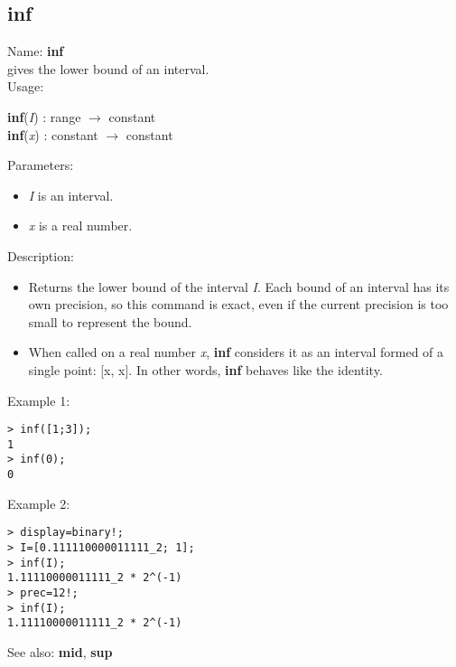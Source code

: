 \subsection{ inf }
\noindent Name: \textbf{inf}\\
gives the lower bound of an interval.\\

\noindent Usage: 
\begin{center}
\textbf{inf}(\emph{I}) : \textsf{range} $\rightarrow$ \textsf{constant}\\
\textbf{inf}(\emph{x}) : \textsf{constant} $\rightarrow$ \textsf{constant}\\
\end{center}
Parameters: 
\begin{itemize}
\item \emph{I} is an interval.
\item \emph{x} is a real number.
\end{itemize}
\noindent Description: \begin{itemize}

\item Returns the lower bound of the interval \emph{I}. Each bound of an interval has its 
   own precision, so this command is exact, even if the current precision is too 
   small to represent the bound.

\item When called on a real number \emph{x}, \textbf{inf} considers it as an interval formed
   of a single point: [x, x]. In other words, \textbf{inf} behaves like the identity.
\end{itemize}
\noindent Example 1: 
\begin{center}\begin{minipage}{15cm}\begin{Verbatim}[frame=single]
> inf([1;3]);
1
> inf(0);
0
\end{Verbatim}
\end{minipage}\end{center}
\noindent Example 2: 
\begin{center}\begin{minipage}{15cm}\begin{Verbatim}[frame=single]
> display=binary!;
> I=[0.111110000011111_2; 1];
> inf(I);
1.11110000011111_2 * 2^(-1)
> prec=12!;
> inf(I);
1.11110000011111_2 * 2^(-1)
\end{Verbatim}
\end{minipage}\end{center}
See also: \textbf{mid}, \textbf{sup}
